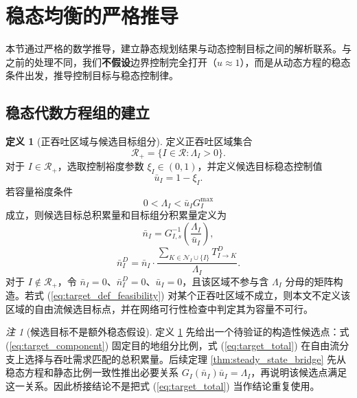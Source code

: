 \documentclass[a4paper,12pt]{article}
\theoremstyle{plain}
\theoremstyle{definition}
\newtheorem{definition}[theorem]{定义}
\theoremstyle{remark}
\newtheorem{remark}[theorem]{注}
\begin{document}
\section{稳态均衡的严格推导}

本节通过严格的数学推导，建立静态规划结果与动态控制目标之间的解析联系。与之前的处理不同，我们\textbf{不假设}边界控制完全打开（$u\approx 1$），而是从动态方程的稳态条件出发，推导控制目标与稳态控制律。

\subsection{稳态代数方程组的建立}

\begin{definition}[正吞吐区域与候选目标组分]\label{def:target_component}
定义正吞吐区域集合
\begin{equation}\label{eq:positive_regions}
    \mathcal R_+ = \{I\in\mathcal R:\Lambda_I>0\}.
\end{equation}
对于 $I\in\mathcal R_+$，选取控制裕度参数 $\xi_I\in(0,1)$，并定义候选目标稳态控制值
\begin{equation}\label{eq:target_control_margin}
    \bar u_I=1-\xi_I .
\end{equation}
若容量裕度条件
\begin{equation}\label{eq:target_def_feasibility}
    0<\Lambda_I<\bar u_I G_I^{\max}
\end{equation}
成立，则候选目标总积累量和目标组分积累量定义为
\begin{equation}\label{eq:target_total}
    \bar{n}_I = G_{I,s}^{-1}\left(\frac{\Lambda_I}{\bar u_I}\right),
\end{equation}
\begin{equation} \label{eq:target_component}
    \bar{n}_I^D = \bar{n}_I \cdot \frac{\sum_{K \in \mathcal{N}_I \cup \{I\}} T_{I \to K}^D}{\Lambda_I}.
\end{equation}
对于 $I\notin\mathcal R_+$，令 $\bar n_I=0$、$\bar n_I^D=0$、$\bar u_I=0$，且该区域不参与含 $\Lambda_I$ 分母的矩阵构造。若式 (\ref{eq:target_def_feasibility}) 对某个正吞吐区域不成立，则本文不定义该区域的自由流候选目标点，并在网络可行性检查中判定其为容量不可行。
\end{definition}

\begin{remark}[候选目标不是额外稳态假设]\label{rem:target_not_assumption}
定义 \ref{def:target_component} 先给出一个待验证的构造性候选点：式 (\ref{eq:target_component}) 固定目的地组分比例，式 (\ref{eq:target_total}) 在自由流分支上选择与吞吐需求匹配的总积累量。后续定理 \ref{thm:steady_state_bridge} 先从稳态方程和静态比例一致性推出必要关系 $G_I(\bar n_I)\bar u_I=\Lambda_I$，再说明该候选点满足这一关系。因此桥接结论不是把式 (\ref{eq:target_total}) 当作结论重复使用。
\end{remark}
\end{document}
